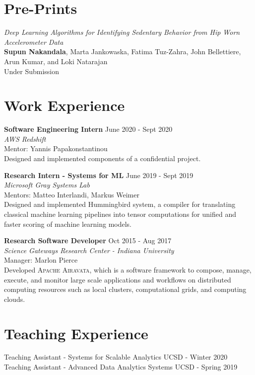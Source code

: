 \documentclass[margin]{res}
\begin{document}
\begin{resume}
\vspace{2mm}
\section{Pre-Prints}
\par
\textit{Deep Learning Algorithms for Identifying Sedentary Behavior from Hip Worn Accelerometer Data} \\
\textbf{Supun Nakandala}, Marta Jankowaska, Fatima Tuz-Zahra, John Bellettiere, Arun Kumar, and Loki Natarajan\\
Under Submission


\section{Work Experience}

\textbf{Software Engineering Intern}
\hfill June 2020 - Sept 2020 \\
\textit{AWS Redshift} \\
Mentor: Yannis Papakonstantinou\\
Designed and implemented components of a confidential project.

\textbf{Research Intern - Systems for ML}
\hfill June 2019 - Sept 2019 \\
\textit{Microsoft Gray Systems Lab} \\
Mentors: Matteo Interlandi, Markus Weimer\\
Designed and implemented Hummingbird system, a compiler for translating classical machine learning pipelines into tensor computations for unified and faster scoring of machine learning models.


\textbf{Research Software Developer}
\hfill Oct 2015 - Aug 2017 \\
\textit{Science Gateways Research Center - Indiana University} \\
Manager: Marlon Pierce\\
Developed \textsc{Apache Airavata}, which is a software framework to compose, manage, execute, and monitor large scale applications and workflows on distributed computing resources such as local clusters, computational grids, and computing clouds.



\section{Teaching Experience}
Teaching Assistant - Systems for Scalable Analytics \hfill UCSD - Winter 2020\\
Teaching Assistant - Advanced Data Analytics Systems \hfill UCSD - Spring 2019


\end{resume}
\end{document}
